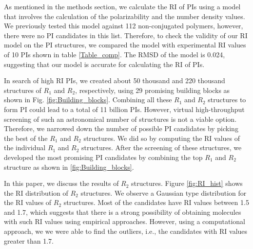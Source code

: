 As mentioned in the methods section, we calculate the RI of PIs using a model that involves the calculation of the polarizability and the number density values. We previously tested this model against 112 non-conjugated polymers, however, there were no PI candidates in this list. Therefore, to check the validity of our RI model on the PI structures, we compared the model with experimental RI values of 10 PIs shown in table \ref{Table_comp}. The RMSD of the model is 0.024, suggesting that our model is accurate for calculating the RI of PIs.

In search of high RI PIs, we created about 50 thousand and 220 thousand structures of $R_1$ and $R_2$, respectively, using 29 promising building blocks as shown in Fig. \ref{fig:Building_blocks}. Combining all these $R_1$ and $R_2$ structures to form PI could lead to a total of 11 billion PIs. However, virtual high-throughput screening of such an astronomical number of structures is not a viable option. Therefore, we narrowed down the number of possible PI candidates by picking the best of the $R_1$ and $R_2$ structures. We did so by computing the RI values of the individual $R_1$ and $R_2$ structures. After the screening of these structures, we developed the most promising PI candidates by combining the top $R_1$ and $R_2$ structure as shown in \ref{fig:Building_blocks}. 

In this paper, we discuss the results of $R_2$ structures. Figure \ref{fig:RI_hist} shows the RI distribution of $R_2$ structures. We observe a Gaussian type distribution for the RI values of $R_2$ structures. Most of the candidates have RI values between 1.5 and 1.7, which suggests that there is a strong possibility of obtaining molecules with such RI values using empirical approaches. However, using a computational approach, we we were able to find the outliers, i.e., the candidates with RI values greater than 1.7. 


